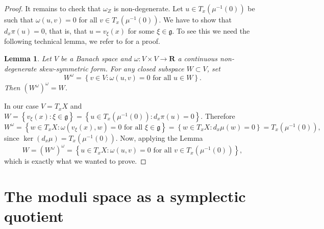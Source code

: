 \documentclass[12pt,a4paper]{book}
\newtheorem{lema}[thm]{Lemma}
\theoremstyle{definition} \newtheorem{defn}[thm]{Definition}
\theoremstyle{definition} \newtheorem{ejemplo}[thm]{Example}
\theoremstyle{remark} \newtheorem*{rem}{Remark}
\def\gg{\mathfrak{g}}
\def\RR{\mathbf{R}}
\begin{document}
\begin{proof}
      It remains to check that $\omega_Z$ is non-degenerate. Let $u\in T_x(\mu^{-1}(0))$ be such that $\omega(u,v)=0$ for all $v\in T_x(\mu^{-1}(0))$. We have to show that $d_x\pi(u)=0$, that is, that $u=v_\xi(x)$ for some $\xi\in \gg$. To see this we need the following technical lemma, we refer to \cite{kobayashi} for a proof.
      \begin{lema}
	Let $V$ be a Banach space and $\omega:V\times V \rightarrow \RR$ a continuous non-degenerate skew-symmetric form. For any closed subspace $W\subset V$, set
	\begin{equation*}
	  W^\omega=\left\{ v\in V:\omega(u,v)=0 \text{ for all } u \in W \right\}.
	\end{equation*}
	Then $(W^\omega)^\omega=W$.
      \end{lema}

      In our case $V=T_xX$ and $W=\left\{ v_\xi(x) : \xi \in \gg \right\}=\left\{ u \in T_x(\mu^{-1}(0)) : d_x\pi(u)=0 \right\}$. Therefore
      \begin{equation*}
	W^\omega=\left\{ w\in T_xX: \omega(v_\xi(x),w)=0 \text{ for all } \xi \in \gg \right\}=\left\{ w\in T_xX: d_x\mu(w)=0 \right\}=T_x(\mu^{-1}(0)),
      \end{equation*}
      since $\ker(d_x\mu)=T_x(\mu^{-1}(0))$. Now, applying the Lemma
      \begin{equation*}
	W=(W^\omega)^\omega=\left\{ u\in T_x X: \omega(u,v)=0 \text{ for all } v\in T_x(\mu^{-1}(0)) \right\},
      \end{equation*}
     which is exactly what we wanted to prove.
    \end{proof}

    \section{The moduli space as a symplectic quotient}



\nocite{*}


\end{document}
